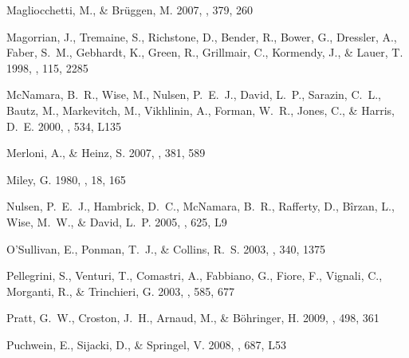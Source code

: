\documentclass[12pt, preprint]{aastex}
\begin{document}
\begin{thebibliography}{68}
{Magliocchetti}, M., \& {Br{\"u}ggen}, M. 2007, \mnras, 379, 260

{Magorrian}, J., {Tremaine}, S., {Richstone}, D., {Bender}, R., {Bower}, G.,
  {Dressler}, A., {Faber}, S.~M., {Gebhardt}, K., {Green}, R., {Grillmair}, C.,
  {Kormendy}, J., \& {Lauer}, T. 1998, \aj, 115, 2285

{McNamara}, B.~R., {Wise}, M., {Nulsen}, P.~E.~J., {David}, L.~P., {Sarazin},
  C.~L., {Bautz}, M., {Markevitch}, M., {Vikhlinin}, A., {Forman}, W.~R.,
  {Jones}, C., \& {Harris}, D.~E. 2000, \apjl, 534, L135

{Merloni}, A., \& {Heinz}, S. 2007, \mnras, 381, 589

{Miley}, G. 1980, \araa, 18, 165

{Nulsen}, P.~E.~J., {Hambrick}, D.~C., {McNamara}, B.~R., {Rafferty}, D.,
  {B\^irzan}, L., {Wise}, M.~W., \& {David}, L.~P. 2005, \apjl, 625, L9

{O'Sullivan}, E., {Ponman}, T.~J., \& {Collins}, R.~S. 2003, \mnras, 340, 1375

{Pellegrini}, S., {Venturi}, T., {Comastri}, A., {Fabbiano}, G., {Fiore}, F.,
  {Vignali}, C., {Morganti}, R., \& {Trinchieri}, G. 2003, \apj, 585, 677

{Pratt}, G.~W., {Croston}, J.~H., {Arnaud}, M., \& {B{\"o}hringer}, H. 2009,
  \aap, 498, 361

{Puchwein}, E., {Sijacki}, D., \& {Springel}, V. 2008, \apjl, 687, L53


\end{thebibliography}
\end{document}
